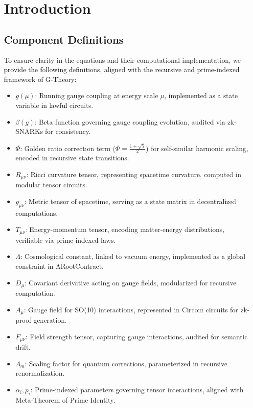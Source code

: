 \documentclass{article}
\theoremstyle{plain}
\begin{document}
\section{Introduction}

\subsection{Component Definitions}
To ensure clarity in the equations and their computational implementation, we provide the following definitions, aligned with the recursive and prime-indexed framework of G-Theory:

\begin{itemize}
    \item $g(\mu)$: Running gauge coupling at energy scale $\mu$, implemented as a state variable in lawful circuits.
    \item $\beta(g)$: Beta function governing gauge coupling evolution, audited via zk-SNARKs for consistency.
    \item $\Phi$: Golden ratio correction term ($ \Phi = \frac{1 + \sqrt{5}}{2} $) for self-similar harmonic scaling, encoded in recursive state transitions.
    \item $R_{\mu\nu}$: Ricci curvature tensor, representing spacetime curvature, computed in modular tensor circuits.
    \item $g_{\mu\nu}$: Metric tensor of spacetime, serving as a state matrix in decentralized computations.
    \item $T_{\mu\nu}$: Energy-momentum tensor, encoding matter-energy distributions, verifiable via prime-indexed laws.
    \item $\Lambda$: Cosmological constant, linked to vacuum energy, implemented as a global constraint in ΛRootContract.
    \item $D_{\mu}$: Covariant derivative acting on gauge fields, modularized for recursive computation.
    \item $A_{\mu}$: Gauge field for SO(10) interactions, represented in Circom circuits for zk-proof generation.
    \item $F_{\mu\nu}$: Field strength tensor, capturing gauge interactions, audited for semantic drift.
    \item $\Lambda_m$: Scaling factor for quantum corrections, parameterized in recursive renormalization.
    \item $\alpha_i, p_i$: Prime-indexed parameters governing tensor interactions, aligned with Meta-Theorem of Prime Identity.

\end{itemize}
\end{document}
